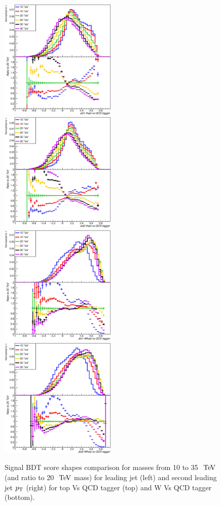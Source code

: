 \documentclass{cernrep}
\begin{document}
\begin{figure}[!htb]\centering
\includegraphics[width=0.495\textwidth]{Fig/TMVA/Jet1_thad_vs_QCD_tagger.eps}
\includegraphics[width=0.495\textwidth]{Fig/TMVA/Jet2_thad_vs_QCD_tagger.eps}
\includegraphics[width=0.495\textwidth]{Fig/TMVA/Jet1_Whad_vs_QCD_tagger.eps}
\includegraphics[width=0.495\textwidth]{Fig/TMVA/Jet2_Whad_vs_QCD_tagger.eps}
\caption{Signal BDT score shapes comparison for masses from 10 to 35 $\TeV$ (and ratio to 20 $\TeV$ mass) for leading jet (left) and second leading jet $p_{\text{T}}$ (right) for top Vs QCD tagger (top) and W Vs QCD tagger (bottom).}
\label{fig:BDT_signal_shape_comparison}
\end{figure}
\end{document}
